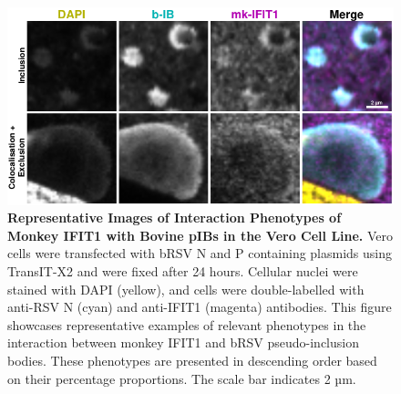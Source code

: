 \begin{figure}
    \centering
    \includegraphics[width=1\linewidth]{09. Chapter 4/Figs/01. pIB/02. IFIT1/09. i1-vero-bnbp.pdf}
    \caption[Representative Images of Interaction Phenotypes of Monkey IFIT1 with Bovine pIBs in the Vero Cell Line.]{\textbf{Representative Images of Interaction Phenotypes of Monkey IFIT1 with Bovine pIBs in the Vero Cell Line.} Vero cells were transfected with bRSV N and P containing plasmids using TransIT-X2 and were fixed after 24 hours. Cellular nuclei were stained with DAPI (yellow), and cells were double-labelled with anti-RSV N (cyan) and anti-IFIT1 (magenta) antibodies. This figure showcases representative examples of relevant phenotypes in the interaction between monkey IFIT1 and bRSV pseudo-inclusion bodies. These phenotypes are presented in descending order based on their percentage proportions. The scale bar indicates 2 µm.}
    \label{fig:Representative Images of Interaction Phenotypes of Monkey IFIT1 with Bovine pIBs in the VERO Cell Line}
\end{figure}


